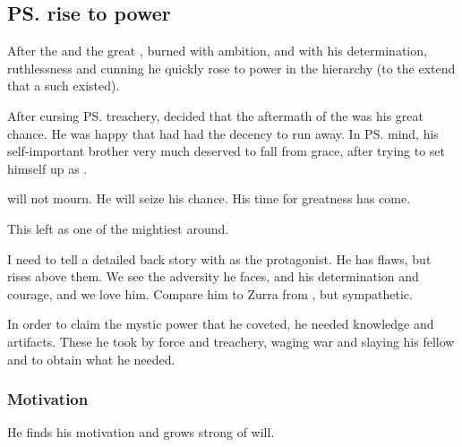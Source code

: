 \subsection{\ps{\Secherdamon} rise to power}
After the  and the great \secondbanewar, \HriistD{} burned with ambition, and with his determination, ruthlessness and cunning he quickly rose to power in the \draconic{} hierarchy (to the extend that a such existed).

After cursing \ps{\Ishnaruchaefir} treachery, \Secherdamon{} decided that the aftermath of the \secondbanewar{} was his great chance. 
He was happy that \Ishnaruchaefir{} had had the decency to run away. 
In \ps{\Secherdamon} mind, his self-important brother very much deserved to fall from grace, after trying to set himself up as \dragonlord. 


\Secherdamon{} will not mourn. 
He will seize his chance. 
His time for greatness has come. 



This left \Secherdamon{} as one of the mightiest \dragons{} around. 

I need to tell a detailed back story with \Secherdamon{} as the protagonist. 
He has flaws, but rises above them. 
We see the adversity he faces, and his determination and courage, and we love him. 
Compare him to Zurra from , but sympathetic.

In order to claim the mystic power that he coveted, he needed  knowledge and artifacts. 
These he took by force and treachery, waging war and slaying his fellow \dragons{} and \ophidian{} to obtain what he needed.





\subsubsection{Motivation}
He finds his motivation and grows strong of will.


